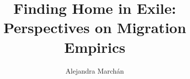 \documentclass[longtable,floatsintext,man]{apa7} %
\title{Finding Home in Exile: Perspectives on Migration Empirics}
\author{Alejandra Marchán}
\date{}
\begin{document}

\clearpage %

\justifying
\clearpage 

\clearpage

\clearpage

\clearpage
\tableofcontents %
\clearpage
\listoftables %
\clearpage
\listoffigures %
\clearpage

\clearpage

\clearpage

\clearpage


\clearpage

\clearpage

\clearpage

\clearpage

\clearpage

\clearpage

\end{document}
